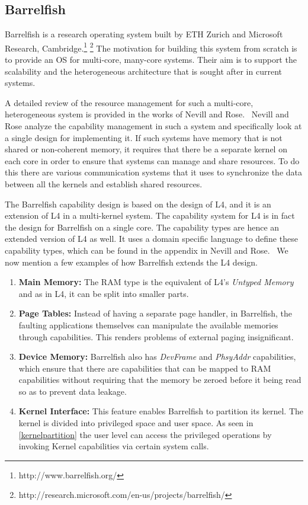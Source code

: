 \subsection{Barrelfish}
\label{subsec:Barrelfish}
Barrelfish is a research operating system built by ETH Zurich and Microsoft Research, Cambridge.\footnote{http://www.barrelfish.org/} \footnote{http://research.microsoft.com/en-us/projects/barrelfish/} The motivation for building this system from scratch is to provide an OS for multi-core, many-core systems. Their aim is to support the scalability and the heterogeneous architecture that is sought after in current systems. 

A detailed review of the resource management for such a multi-core, heterogeneous system is provided in the works of Nevill and Rose.~\cite{nevillmasters} Nevill and Rose analyze the capability management in such a system and specifically look at a single design for implementing it. If such systems have memory that is not shared or non-coherent memory, it requires that there be a separate kernel on each core in order to ensure that systems can manage and share resources. To do this there are various communication systems that it uses to synchronize the data between all the kernels and establish shared resources. 

The Barrelfish capability design is based on the design of L4, and it is an extension of L4 in a multi-kernel system. The capability system for L4 is in fact the design for Barrelfish on a single core. The capability types are hence an extended version of L4 as well. It uses a domain specific language to define these capability types, which can be found in the appendix in Nevill and Rose.~\cite{nevillmasters} We now mention a few examples of how Barrelfish extends the L4 design.

\begin{enumerate}
\item \textbf{Main Memory:} The RAM type is the equivalent of L4's \textit{Untyped Memory} and as in L4, it can be split into smaller parts.
\item \textbf{Page Tables:} Instead of having a separate page handler, in Barrelfish, the faulting applications themselves can manipulate the available memories through capabilities. This renders problems of external paging insignificant.
\item \textbf{Device Memory:} Barrelfish also has \textit{DevFrame} and \textit{PhsyAddr} capabilities, which ensure that there are capabilities that can be mapped to RAM capabilities without requiring that the memory be zeroed before it being read so as to prevent data leakage.
\item \textbf{Kernel Interface:} This feature enables Barrelfish to partition its kernel. The kernel is divided into privileged space and user space. As seen in \ref{kernelpartition} the user level can access the privileged operations by invoking Kernel capabilities via certain system calls.
\end{enumerate}

